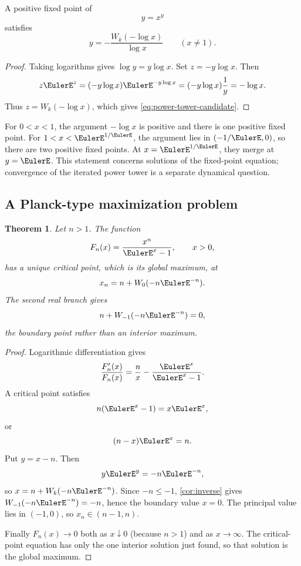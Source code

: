 \documentclass[11pt]{article}
\newtheorem{theorem}{Theorem}[section]
\theoremstyle{remark}
\begin{document}
A positive fixed point of
\[
       y=x^y
\]
satisfies
\begin{equation}\label{eq:power-tower-candidate}
       y=-\frac{W_k(-\log x)}{\log x}
       \qquad(x\neq1).
\end{equation}

\begin{proof}
Taking logarithms gives \(\log y=y\log x\).  Set
\(z=-y\log x\).  Then
\[
       z\EulerE^z=(-y\log x)\EulerE^{-y\log x}
             =(-y\log x)\frac1y
             =-\log x.
\]
Thus \(z=W_k(-\log x)\), which gives
\eqref{eq:power-tower-candidate}.
\end{proof}

For \(0<x<1\), the argument \(-\log x\) is positive and there is one positive
fixed point.  For \(1<x<\EulerE^{1/\EulerE}\), the argument lies in
\((-1/\EulerE,0)\), so there are two positive fixed points.  At
\(x=\EulerE^{1/\EulerE}\), they merge at \(y=\EulerE\).  This statement concerns
solutions of the fixed-point equation; convergence of the iterated power
tower is a separate dynamical question.

\subsection{A Planck-type maximization problem}

\begin{theorem}\label{thm:planckmax}
Let \(n>1\).  The function
\[
       F_n(x)=\frac{x^n}{\EulerE^x-1},\qquad x>0,
\]
has a unique critical point, which is its global maximum, at
\begin{equation}\label{eq:planckmax}
       x_n=n+W_0(-n\EulerE^{-n}).
\end{equation}
The second real branch gives
\[
       n+W_{-1}(-n\EulerE^{-n})=0,
\]
the boundary point rather than an interior maximum.
\end{theorem}

\begin{proof}
Logarithmic differentiation gives
\[
 \frac{F_n'(x)}{F_n(x)}
 =\frac nx-\frac{\EulerE^x}{\EulerE^x-1}.
\]
A critical point satisfies
\[
       n(\EulerE^x-1)=x\EulerE^x,
\]
or
\[
       (n-x)\EulerE^x=n.
\]
Put \(y=x-n\).  Then
\[
       y\EulerE^y=-n\EulerE^{-n},
\]
so \(x=n+W_k(-n\EulerE^{-n})\).  Since \(-n\leq-1\),
\cref{cor:inverse} gives
\(W_{-1}(-n\EulerE^{-n})=-n\), hence the boundary value \(x=0\).
The principal value lies in \((-1,0)\), so
\(x_n\in(n-1,n)\).

Finally \(F_n(x)\to0\) both as \(x\downarrow0\) (because \(n>1\)) and as
\(x\to\infty\).  The critical-point equation has only the one interior
solution just found, so that solution is the global maximum.
\end{proof}
\end{document}
